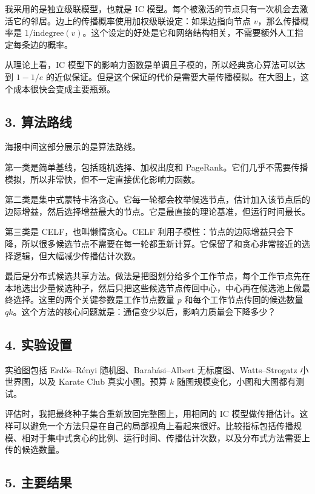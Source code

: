 \documentclass[11pt]{ctexart}
\begin{document}
我采用的是独立级联模型，也就是 IC 模型。每个被激活的节点只有一次机会去激活它的邻居。边上的传播概率使用加权级联设定：如果边指向节点 $v$，那么传播概率是 $1/\mathrm{indegree}(v)$。这个设定的好处是它和网络结构相关，不需要额外人工指定每条边的概率。

从理论上看，IC 模型下的影响力函数是单调且子模的，所以经典贪心算法可以达到 $1-1/e$ 的近似保证。但是这个保证的代价是需要大量传播模拟。在大图上，这个成本很快会变成主要瓶颈。

\subsection*{3. 算法路线}

海报中间这部分展示的是算法路线。

第一类是简单基线，包括随机选择、加权出度和 PageRank。它们几乎不需要传播模拟，所以非常快，但不一定直接优化影响力函数。

第二类是集中式蒙特卡洛贪心。它每一轮都会枚举候选节点，估计加入该节点后的边际增益，然后选择增益最大的节点。它是最直接的理论基准，但运行时间最长。

第三类是 CELF，也叫懒惰贪心。CELF 利用子模性：节点的边际增益只会下降，所以很多候选节点不需要在每一轮都重新计算。它保留了和贪心非常接近的选择逻辑，但大幅减少传播估计次数。

最后是分布式候选共享方法。做法是把图划分给多个工作节点，每个工作节点先在本地选出少量候选种子，然后只把这些候选节点传回中心，中心再在候选池上做最终选择。这里的两个关键参数是工作节点数量 $p$ 和每个工作节点传回的候选数量 $qk$。这个方法的核心问题就是：通信变少以后，影响力质量会下降多少？

\subsection*{4. 实验设置}

实验图包括 Erdős--Rényi 随机图、Barabási--Albert 无标度图、Watts--Strogatz 小世界图，以及 Karate Club 真实小图。预算 $k$ 随图规模变化，小图和大图都有测试。

评估时，我把最终种子集合重新放回完整图上，用相同的 IC 模型做传播估计。这样可以避免一个方法只是在自己的局部视角上看起来很好。比较指标包括传播规模、相对于集中式贪心的比例、运行时间、传播估计次数，以及分布式方法需要上传的候选数量。

\subsection*{5. 主要结果}
\end{document}
